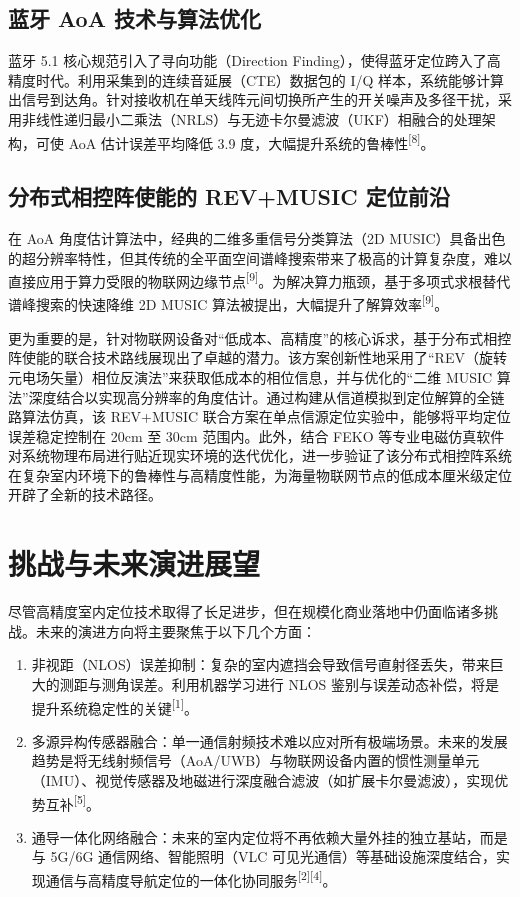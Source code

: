 \documentclass[UTF8,a4paper,12pt]{ctexart}
\newcommand{\refmark}[1]{\textsuperscript{[#1]}}
\begin{document}
\subsection{蓝牙 AoA 技术与算法优化}
蓝牙 5.1 核心规范引入了寻向功能（Direction Finding），使得蓝牙定位跨入了高精度时代。利用采集到的连续音延展（CTE）数据包的 I/Q 样本，系统能够计算出信号到达角。针对接收机在单天线阵元间切换所产生的开关噪声及多径干扰，采用非线性递归最小二乘法（NRLS）与无迹卡尔曼滤波（UKF）相融合的处理架构，可使 AoA 估计误差平均降低 3.9 度，大幅提升系统的鲁棒性\refmark{8}。
\subsection{分布式相控阵使能的 REV+MUSIC 定位前沿}
在 AoA 角度估计算法中，经典的二维多重信号分类算法（2D MUSIC）具备出色的超分辨率特性，但其传统的全平面空间谱峰搜索带来了极高的计算复杂度，难以直接应用于算力受限的物联网边缘节点\refmark{9}。为解决算力瓶颈，基于多项式求根替代谱峰搜索的快速降维 2D MUSIC 算法被提出，大幅提升了解算效率\refmark{9}。

更为重要的是，针对物联网设备对“低成本、高精度”的核心诉求，基于分布式相控阵使能的联合技术路线展现出了卓越的潜力。该方案创新性地采用了“REV（旋转元电场矢量）相位反演法”来获取低成本的相位信息，并与优化的“二维 MUSIC 算法”深度结合以实现高分辨率的角度估计。通过构建从信道模拟到定位解算的全链路算法仿真，该 REV+MUSIC 联合方案在单点信源定位实验中，能够将平均定位误差稳定控制在 20cm 至 30cm 范围内。此外，结合 FEKO 等专业电磁仿真软件对系统物理布局进行贴近现实环境的迭代优化，进一步验证了该分布式相控阵系统在复杂室内环境下的鲁棒性与高精度性能，为海量物联网节点的低成本厘米级定位开辟了全新的技术路径。

\section{挑战与未来演进展望}
尽管高精度室内定位技术取得了长足进步，但在规模化商业落地中仍面临诸多挑战。未来的演进方向将主要聚焦于以下几个方面：
\begin{enumerate}[leftmargin=2em]
\item 非视距（NLOS）误差抑制：复杂的室内遮挡会导致信号直射径丢失，带来巨大的测距与测角误差。利用机器学习进行 NLOS 鉴别与误差动态补偿，将是提升系统稳定性的关键\refmark{1}。
\item 多源异构传感器融合：单一通信射频技术难以应对所有极端场景。未来的发展趋势是将无线射频信号（AoA/UWB）与物联网设备内置的惯性测量单元（IMU）、视觉传感器及地磁进行深度融合滤波（如扩展卡尔曼滤波），实现优势互补\refmark{5}。
\item 通导一体化网络融合：未来的室内定位将不再依赖大量外挂的独立基站，而是与 5G/6G 通信网络、智能照明（VLC 可见光通信）等基础设施深度结合，实现通信与高精度导航定位的一体化协同服务\refmark{2}\refmark{4}。
\end{enumerate}
\end{document}
